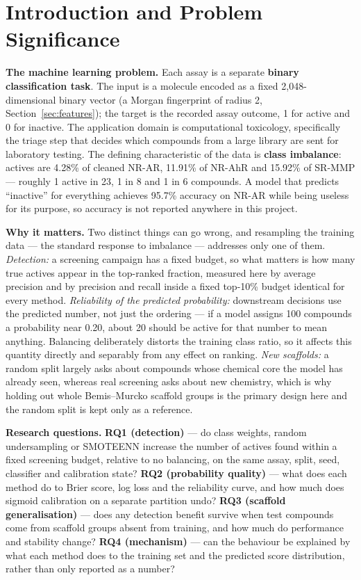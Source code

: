 \documentclass[10pt,letterpaper]{article}
\begin{document}
\section{Introduction and Problem Significance}

\textbf{The machine learning problem.} Each assay is a separate \textbf{binary classification task}.
The input is a molecule encoded as a fixed 2{,}048-dimensional binary vector (a Morgan fingerprint
of radius 2, Section~\ref{sec:features}); the target is the recorded assay outcome, 1 for active and
0 for inactive. The application domain is computational toxicology, specifically the triage step
that decides which compounds from a large library are sent for laboratory testing. The defining
characteristic of the data is \textbf{class imbalance}: actives are 4.28\% of cleaned NR-AR, 11.91\%
of NR-AhR and 15.92\% of SR-MMP --- roughly 1 active in 23, 1 in 8 and 1 in 6 compounds. A model
that predicts ``inactive'' for everything achieves 95.7\% accuracy on NR-AR while being useless for
its purpose, so accuracy is not reported anywhere in this project.

\textbf{Why it matters.} Two distinct things can go wrong, and resampling the training data ---
the standard response to imbalance --- addresses only one of them. \emph{Detection:} a screening
campaign has a fixed budget, so what matters is how many true actives appear in the top-ranked
fraction, measured here by average precision and by precision and recall inside a fixed top-10\%
budget identical for every method. \emph{Reliability of the predicted probability:} downstream
decisions use the predicted number, not just the ordering --- if a model assigns 100 compounds a
probability near 0.20, about 20 should be active for that number to mean anything. Balancing
deliberately distorts the training class ratio, so it affects this quantity directly and separably
from any effect on ranking. \emph{New scaffolds:} a random split largely asks about compounds whose
chemical core the model has already seen, whereas real screening asks about new chemistry, which is
why holding out whole Bemis--Murcko scaffold groups is the primary design here and the random split
is kept only as a reference.

\textbf{Research questions.} \textbf{RQ1 (detection)} --- do class weights, random undersampling
or SMOTEENN increase the number of actives found within a fixed screening budget, relative to no
balancing, on the same assay, split, seed, classifier and calibration state? \textbf{RQ2
(probability quality)} --- what does each method do to Brier score, log loss and the reliability
curve, and how much does sigmoid calibration on a separate partition undo? \textbf{RQ3 (scaffold
generalisation)} --- does any detection benefit survive when test compounds come from scaffold groups
absent from training, and how much do performance and stability change? \textbf{RQ4 (mechanism)} ---
can the behaviour be explained by what each method does to the training set and the predicted score
distribution, rather than only reported as a number?
\end{document}
